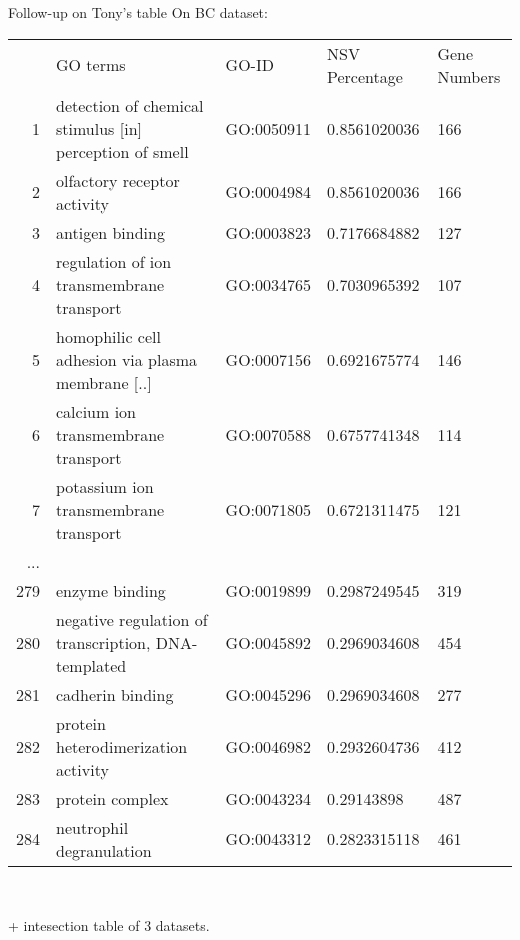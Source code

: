 \documentclass[onepage]{beamer}
\begin{document}

\begin{frame}[t]{Follow-up on Tony's table}{}
	On BC dataset:

	{
		\tiny
		
		\begin{table}[]
		\label{my-label}
		\begin{tabular}{rllll}
			& GO terms                                                               & GO-ID      & NSV Percentage & Gene Numbers \\
		1   & detection of chemical stimulus [in] perception of smell & GO:0050911 & 0.8561020036   & 166          \\
		2   & olfactory receptor activity                                            & GO:0004984 & 0.8561020036   & 166          \\
		3   & antigen binding                                                        & GO:0003823 & 0.7176684882   & 127          \\
		4   & regulation of ion transmembrane transport                              & GO:0034765 & 0.7030965392   & 107          \\
		5   & homophilic cell adhesion via plasma membrane [..]        & GO:0007156 & 0.6921675774   & 146          \\
		6   & calcium ion transmembrane transport                                    & GO:0070588 & 0.6757741348   & 114          \\
		7   & potassium ion transmembrane transport                                  & GO:0071805 & 0.6721311475   & 121          \\
		... &                                                                        &            &                &              \\
		279 & enzyme binding                                                         & GO:0019899 & 0.2987249545   & 319          \\
		280 & negative regulation of transcription, DNA-templated                    & GO:0045892 & 0.2969034608   & 454          \\
		281 & cadherin binding                                                       & GO:0045296 & 0.2969034608   & 277          \\
		282 & protein heterodimerization activity                                    & GO:0046982 & 0.2932604736   & 412          \\
		283 & protein complex                                                        & GO:0043234 & 0.29143898     & 487          \\
		284 & neutrophil degranulation                                               & GO:0043312 & 0.2823315118   & 461         
		\end{tabular}
		\end{table}
	}
	
	{\ }
	
	+ intesection table of 3 datasets.
\end{frame}
\end{document}
